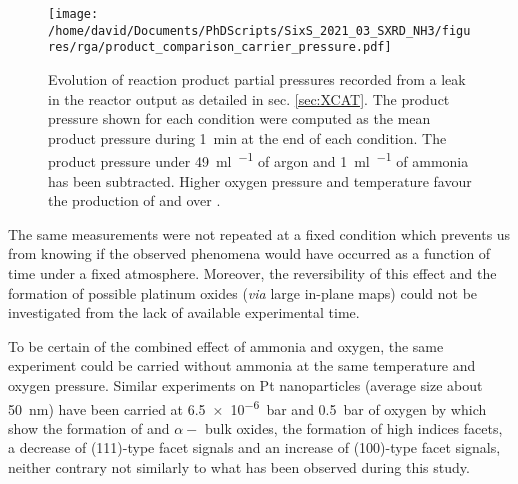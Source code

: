 \begin{figure}[!htb]
    \centering
    \texttt{[image: /home/david/Documents/PhDScripts/SixS\_2021\_03\_SXRD\_NH3/figures/rga/product\_comparison\_carrier\_pressure.pdf]}
    \caption{
        Evolution of reaction product partial pressures  recorded from a leak in the reactor output as detailed in sec. \ref{sec:XCAT}.
        The product pressure shown for each condition were computed as the mean product pressure during \qty{1}{\minute} at the end of each condition.
        The product pressure under \qty{49}{\ml\per\min} of argon and \qty{1}{\ml\per\min} of ammonia has been subtracted.
        Higher oxygen pressure and temperature favour the production of  and  over .
    }
    \label{fig:RGASXRDNanoparticlesComparison}
\end{figure}

The same measurements were not repeated at a fixed condition which prevents us from knowing if the observed phenomena would have occurred as a function of time under a fixed atmosphere.
Moreover, the reversibility of this effect and the formation of possible platinum oxides (\textit{via} large in-plane maps) could not be investigated from the lack of available experimental time.

To be certain of the combined effect of ammonia and oxygen, the same experiment could be carried without ammonia at the same temperature and oxygen pressure.
Similar experiments on Pt nanoparticles (average size about \qty{50}{\nm}) have been carried at \qty{6.5e-6}{\bar} and \qty{0.5}{\bar} of oxygen by \cite{Hejral2013} which show the formation of  and $\alpha-$ bulk oxides, the formation of high indices facets, a decrease of (111)-type facet signals and an increase of (100)-type facet signals, neither contrary not similarly to what has been observed during this study.
